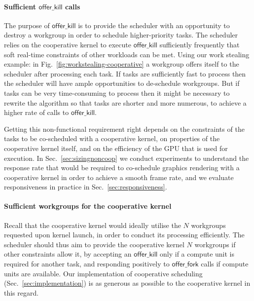 \documentclass[numbers,nocopyrightspace,10pt]{sigplanconf}
\newcommand{\myfig}{Fig.~}
\newcommand{\mysec}{Sec.~}
\newcommand{\offerfork}{\mathsf{offer\_fork}}
\newcommand{\offerkill}{\mathsf{offer\_kill}}
\begin{document}
\paragraph{Sufficient $\offerkill$ calls}

The purpose of $\offerkill$ is to provide the scheduler with an
opportunity to destroy a workgroup in order to schedule
higher-priority tasks.  The scheduler relies on the cooperative kernel
to execute $\offerkill$ sufficiently frequently that soft real-time
constraints of other workloads can be met.
%
Using our work stealing example: in
\myfig\ref{fig:workstealing-cooperative} a workgroup offers itself to
the scheduler after processing each task.  If tasks are sufficiently
fast to process then the scheduler will have ample opportunities to
de-schedule workgroups.  But if tasks can be very time-consuming to
process then it might be necessary to rewrite the algorithm so that
tasks are shorter and more numerous, to achieve a higher rate of calls
to $\offerkill$.

Getting this non-functional requirement right depends on the
constraints of the tasks to be co-scheduled with a cooperative kernel,
on properties of the cooperative kernel itself, and on the efficiency
of the GPU that is used for execution.  In \mysec\ref{sec:sizingnoncoop} we conduct
experiments to understand the response rate that would be required to
co-schedule graphics rendering with a cooperative kernel in order to
achieve a smooth frame rate, and we evaluate responsiveness in
practice in \mysec\ref{sec:responsiveness}.

\paragraph{Sufficient workgroups for the cooperative kernel}

Recall that the cooperative kernel would ideally utilise the $N$
workgroups requested upon kernel launch, in order to conduct its
processing efficiently.  The scheduler should thus aim to provide the
cooperative kernel $N$ workgroups if other constraints allow it,
by accepting an $\offerkill$ only if a compute unit is required for another
task, and responding positively to $\offerfork$ calls if compute units are available.  Our
implementation of cooperative scheduling (\mysec\ref{sec:implementation}) is as
generous as possible to the cooperative kernel in this regard.
\end{document}
